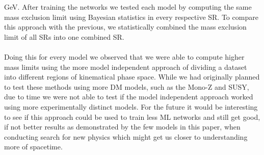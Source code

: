\documentclass[12pt, a4paper]{book}
\begin{document}
GeV. After training the networks we tested each model by computing the same mass exclusion limit using Bayesian statistics in every respective SR. To compare this approach with the previous, we statistically combined the mass exclusion limit of all SRs into 
one combined SR. \\
\\Doing this for every model we observed that we were able to compute higher mass limits using the more model independent approach of dividing a dataset into different regions of kinematical phase space. While we had originally planned to test these methods 
using more DM models, such as the Mono-Z and SUSY, due to time we were not able to test if the model independent approach worked using more experimentally distinct models. For the future it would be interesting to see if this approach could be used to train 
less ML networks and still get good, if not better results as demonstrated by the few models in this paper, when conducting search for new physics which might get us closer to understanding more of spacetime.
\end{document}

